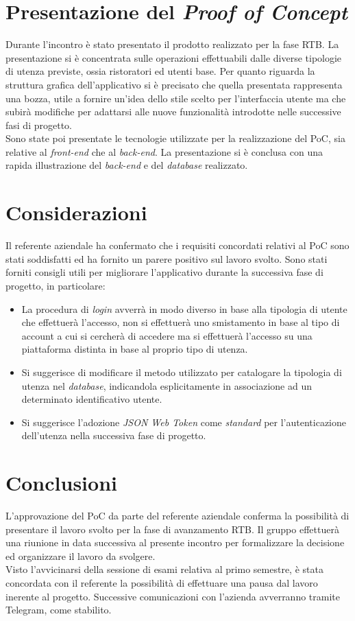 \section{Presentazione del \textit{Proof of Concept}}
Durante l'incontro è stato presentato il prodotto realizzato per la fase RTB.
La presentazione si è concentrata sulle operazioni effettuabili dalle diverse tipologie di utenza previste, ossia ristoratori ed utenti base.
Per quanto riguarda la struttura grafica dell'applicativo si è precisato che quella presentata rappresenta una bozza, utile a fornire un'idea dello stile scelto per l'interfaccia utente ma che subirà modifiche per adattarsi alle nuove funzionalità introdotte nelle successive fasi di progetto.\\
Sono state poi presentate le tecnologie utilizzate per la realizzazione del PoC, sia relative al \textit{front-end} che al \textit{back-end}.
La presentazione si è conclusa con una rapida illustrazione del \textit{back-end} e del \textit{database} realizzato.


\section{Considerazioni}
Il referente aziendale ha confermato che i requisiti concordati relativi al PoC sono stati soddisfatti ed ha fornito un parere positivo sul lavoro svolto.
Sono stati forniti consigli utili per migliorare l'applicativo durante la successiva fase di progetto, in particolare:
\begin{itemize}
	\item La procedura di \textit{login} avverrà in modo diverso in base alla tipologia di utente che effettuerà l'accesso, non si effettuerà uno smistamento in base al tipo di account a cui si cercherà di accedere ma si effettuerà l'accesso su una piattaforma distinta in base al proprio tipo di utenza.
	\item Si suggerisce di modificare il metodo utilizzato per catalogare la tipologia di utenza nel \textit{database}, indicandola esplicitamente in associazione ad un determinato identificativo utente.
	\item Si suggerisce l'adozione \textit{JSON Web Token} come \textit{standard} per l'autenticazione dell'utenza nella successiva fase di progetto.
\end{itemize}


\section{Conclusioni}
L'approvazione del PoC da parte del referente aziendale conferma la possibilità di presentare il lavoro svolto per la fase di avanzamento RTB.
Il gruppo effettuerà una riunione in data successiva al presente incontro per formalizzare la decisione ed organizzare il lavoro da svolgere.\\
Visto l'avvicinarsi della sessione di esami relativa al primo semestre, è stata concordata con il referente la possibilità di effettuare una pausa dal lavoro inerente al progetto.
Successive comunicazioni con l'azienda avverranno tramite Telegram, come stabilito.